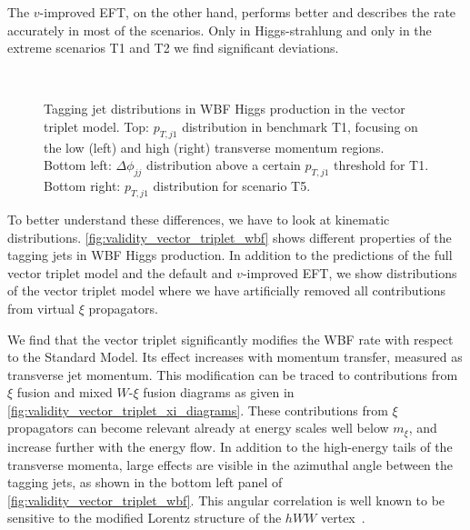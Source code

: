 The $v$-improved EFT, on the other hand, performs better and describes
the rate accurately in most of the scenarios. Only in Higgs-strahlung
and only in the extreme scenarios T1 and T2 we find significant
deviations. 

\begin{figure}
  \\%
  \caption{Tagging jet distributions in WBF Higgs production in the
    vector triplet model.  Top: $p_{T,j1}$ distribution in benchmark
    T1, focusing on the low (left) and high (right) transverse
    momentum regions.  Bottom left: $\Delta \phi_{jj}$ distribution
    above a certain $p_{T,j1}$ threshold for T1.  Bottom right:
    $p_{T,j1}$ distribution for scenario T5.}
  \label{fig:validity_vector_triplet_wbf}
\end{figure}

To better understand these differences, we have to look at kinematic
distributions. \autoref{fig:validity_vector_triplet_wbf} shows
different properties of the tagging jets in WBF Higgs production. In
addition to the predictions of the full vector triplet model and the
default and $v$-improved EFT, we show distributions of the vector
triplet model where we have artificially removed all contributions
from virtual $\xi$ propagators.

We find that the vector triplet significantly modifies the WBF rate
with respect to the Standard Model. Its effect increases with momentum
transfer, measured as transverse jet momentum. This modification can
be traced to contributions from $\xi$ fusion and mixed $W$-$\xi$
fusion diagrams as given in
\autoref{fig:validity_vector_triplet_xi_diagrams}. These contributions
from $\xi$ propagators can become relevant already at energy scales
well below $m_\xi$, and increase further with the energy flow. In
addition to the high-energy tails of the transverse momenta, large
effects are visible in the azimuthal angle between the tagging jets,
as shown in the bottom left panel of
\autoref{fig:validity_vector_triplet_wbf}. This angular correlation is
well known to be sensitive to the modified Lorentz structure of the
$hWW$ vertex~\cite{Eboli:2000ze, Plehn:2001nj, Hankele:2006ma,
  Hagiwara:2009wt, Englert:2012xt, Buckley:2014fqa, Brehmer:2014pka}.

